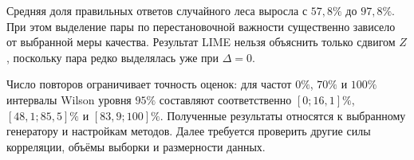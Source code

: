 \documentclass{article}
\begin{document}
Средняя доля правильных ответов случайного леса выросла с $57{,}8\%$ до $97{,}8\%$. При этом выделение пары по перестановочной важности существенно зависело от выбранной меры качества. Результат LIME нельзя объяснить только сдвигом $Z$, поскольку пара редко выделялась уже при $\Delta=0$.

Число повторов ограничивает точность оценок: для частот $0\%$, $70\%$ и $100\%$ интервалы Wilson уровня $95\%$ составляют соответственно $[0;16{,}1]\%$, $[48{,}1;85{,}5]\%$ и $[83{,}9;100]\%$. Полученные результаты относятся к выбранному генератору и настройкам методов. Далее требуется проверить другие силы корреляции, объёмы выборки и размерности данных.



\end{document}
